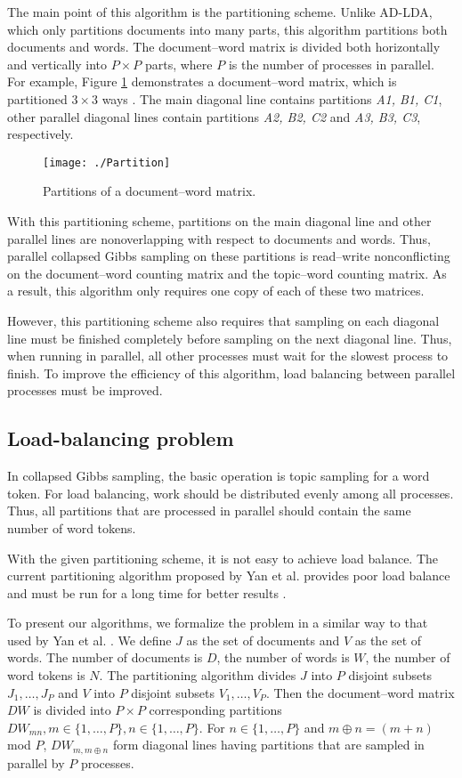 \documentclass[10pt,conference]{IEEEtran}
\begin{document}
The main point of this algorithm is the partitioning scheme. Unlike AD-LDA, which only partitions documents into many parts, this algorithm partitions both documents and words. The document--word matrix is divided both horizontally and vertically into $P \times P$ parts, where $P$ is the number of processes in parallel. For example, Figure \ref{fig:Partition} demonstrates a document--word matrix, which is partitioned $3 \times 3$ ways \cite{ihler2012understanding}. The main diagonal line contains partitions \textit{A1, B1, C1}, other parallel diagonal lines contain partitions \textit{A2, B2, C2} and \textit{A3, B3, C3}, respectively.
\begin{figure}[h]
\centering
\texttt{[image: ./Partition]}
\caption{Partitions of a document--word matrix.}
\label{fig:Partition}
\end{figure}

With this partitioning scheme, partitions on the main diagonal line and other parallel lines are nonoverlapping with respect to documents and words. Thus, parallel collapsed Gibbs sampling on these partitions is read--write nonconflicting on the document--word counting matrix and the topic--word counting matrix. As a result, this algorithm only requires one copy of each of these two matrices.

However, this partitioning scheme also requires that sampling on each diagonal line must be finished completely before sampling on the next diagonal line. Thus, when running in parallel, all other processes must wait for the slowest process to finish. To improve the efficiency of this algorithm, load balancing between parallel processes must be improved.

\subsection{Load-balancing problem}
\label{subsecteta}
In collapsed Gibbs sampling, the basic operation is topic sampling for a word token. For load balancing, work should be distributed evenly among all processes. Thus, all partitions that are processed in parallel should contain the same number of word tokens.

With the given partitioning scheme, it is not easy to achieve load balance. The current partitioning algorithm proposed by Yan et al. provides poor load balance and must be run for a long time for better results \cite{yan2009parallel}.

To present our algorithms, we formalize the problem in a similar way to that used by Yan et al. \cite{yan2009parallel}. We define $J$ as the set of documents and $V$ as the set of words. The number of documents is $D$, the number of words is $W$, the number of word tokens is $N$. The partitioning algorithm divides $J$ into $P$ disjoint subsets $J_1, \ldots, J_P$ and $V$ into $P$ disjoint subsets $V_1, \ldots, V_P$. Then the document--word matrix $DW$ is divided into $P \times P$ corresponding partitions $DW_{mn}, m \in \{1, \ldots, P\}, n \in \{1, \ldots, P\}$. For $n \in \{1, \ldots, P\}$ and $m \oplus n = (m + n)$ mod $P$, $DW_{m, m \oplus n}$ form diagonal lines having partitions that are sampled in parallel by $P$ processes.
\end{document}
